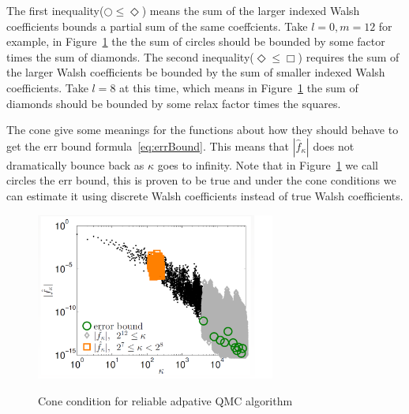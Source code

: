 The first inequality($\bigcirc \leq \Diamond$) means the sum of the larger indexed Walsh coefficients bounds a partial sum of the same coeffcients. Take $l=0, m=12$ for example, in Figure~\ref{fg:cone} the the sum of circles should be bounded by some factor times the sum of diamonds. The second inequality($\Diamond\leq \Box$) requires the sum of the larger Walsh coefficients be bounded by the sum of smaller indexed Walsh coefficients. Take $l=8$ at this time, which means in Figure~\ref{fg:cone} the sum of diamonds should be bounded by some relax factor times the squares.

The cone give some meanings for the functions about how they should behave to get the err bound formula~\eqref{eq:errBound}. This means that $|\hat{f}_\kappa|$ does not dramatically bounce back as $\kappa$ goes to infinity. Note that in Figure~\ref{fg:cone} we call circles the err bound, this is proven to be true and under the cone conditions we can estimate it using discrete Walsh coefficients instead of true Walsh coefficients.
\begin{figure}[h]
    \centering
    \caption{Cone condition for reliable adpative QMC algorithm}
    \includegraphics[width=0.7\textwidth]{figures/cone.bmp}
    \label{fg:cone}
\end{figure}
